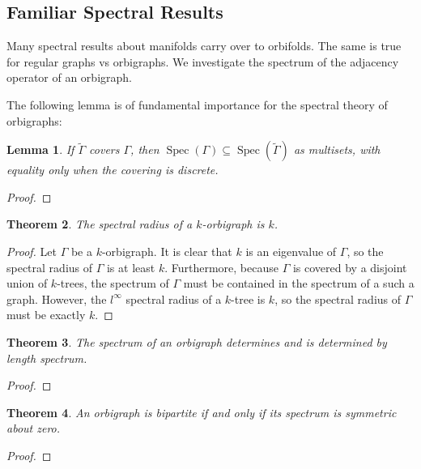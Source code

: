 \documentclass[12pt]{article}
\theoremstyle{plain}
\newtheorem{theorem}{Theorem}
\newtheorem{lemma}[theorem]{Lemma}
\theoremstyle{definition}
\theoremstyle{remark}
\DeclareMathOperator*{\spec}{Spec}
\begin{document}
  \subsection{Familiar Spectral Results}

    Many spectral results about manifolds carry over to orbifolds. The same is true for regular graphs vs orbigraphs. We investigate the spectrum of the adjacency operator of an orbigraph.

    The following lemma is of fundamental importance for the spectral theory of orbigraphs:

    \begin{lemma}\label{SpectrumInclusion}
      If $\widetilde{\Gamma}$ covers $\Gamma$, then $\spec(\Gamma) \subseteq \spec(\widetilde{\Gamma})$ as multisets, with equality only when the covering is discrete.
    \end{lemma}
    \begin{proof}
    \end{proof}

    \begin{theorem}\label{SpectralRadius}
      The spectral radius of a $k$-orbigraph is $k$.
    \end{theorem}
    \begin{proof}
      Let $\Gamma$ be a $k$-orbigraph. It is clear that $k$ is an eigenvalue of $\Gamma$, so the spectral radius of $\Gamma$ is at least $k$. Furthermore, because $\Gamma$ is covered by a disjoint union of $k$-trees, the spectrum of $\Gamma$ must be contained in the spectrum of a such a graph. However, the $l^\infty$ spectral radius of a $k$-tree is $k$, so the spectral radius of $\Gamma$ must be exactly $k$. 
    \end{proof}

    \begin{theorem}\label{LengthSpectrum}
      The spectrum of an orbigraph determines and is determined by length spectrum.
    \end{theorem}
    \begin{proof}
    \end{proof}

    \begin{theorem}\label{BipartiteSymmetry}
      An orbigraph is bipartite if and only if its spectrum is symmetric about zero.
    \end{theorem}
    \begin{proof}
    \end{proof}
\end{document}
